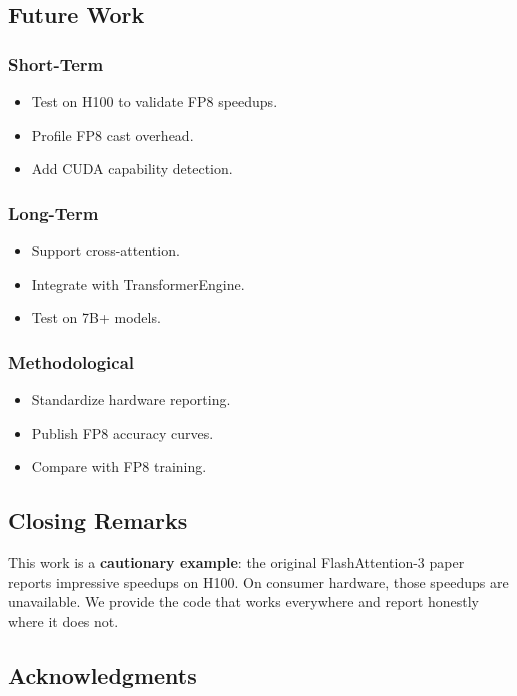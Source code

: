 \subsection{Future Work}

\subsubsection{Short-Term}

\begin{itemize}
\item Test on H100 to validate FP8 speedups.
\item Profile FP8 cast overhead.
\item Add CUDA capability detection.

\end{itemize}
\subsubsection{Long-Term}

\begin{itemize}
\item Support cross-attention.
\item Integrate with TransformerEngine.
\item Test on 7B+ models.

\end{itemize}
\subsubsection{Methodological}

\begin{itemize}
\item Standardize hardware reporting.
\item Publish FP8 accuracy curves.
\item Compare with FP8 training.

\end{itemize}
\subsection{Closing Remarks}

This work is a \textbf{cautionary example}: the original FlashAttention-3 paper 
reports impressive speedups on H100. On consumer hardware, those speedups 
are unavailable. We provide the code that works everywhere and report 
honestly where it does not.

\subsection{Acknowledgments}

